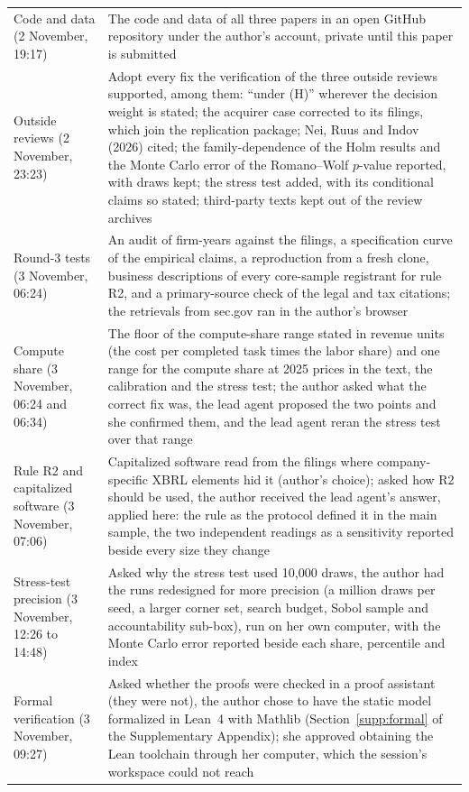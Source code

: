 {\begin{longtable}{@{}p{}p{}@{}}
Code and data (2 November, 19:17) & The code and data of all three papers in an open GitHub repository under the author's account, private until this paper is submitted\\
Outside reviews (2 November, 23:23) & Adopt every fix the verification of the three outside reviews supported, among them: ``under (H)'' wherever the decision weight is stated; the acquirer case corrected to its filings, which join the replication package; Nei, Ruus and Indov (2026) cited; the family-dependence of the Holm results and the Monte Carlo error of the Romano--Wolf $p$-value reported, with \BootB{} draws kept; the stress test added, with its conditional claims so stated; third-party texts kept out of the review archives\\
Round-3 tests (3 November, 06:24) & An audit of firm-years against the filings, a specification curve of the empirical claims, a reproduction from a fresh clone, business descriptions of every core-sample registrant for rule R2, and a primary-source check of the legal and tax citations; the retrievals from sec.gov ran in the author's browser\\
Compute share (3 November, 06:24 and 06:34) & The floor of the compute-share range stated in revenue units (the cost per completed task times the labor share) and one range for the compute share at 2025 prices in the text, the calibration and the stress test; the author asked what the correct fix was, the lead agent proposed the two points and she confirmed them, and the lead agent reran the stress test over that range\\
Rule R2 and capitalized software (3 November, 07:06) & Capitalized software read from the filings where company-specific XBRL elements hid it (author's choice); asked how R2 should be used, the author received the lead agent's answer, applied here: the rule as the protocol defined it in the main sample, the two independent readings as a sensitivity reported beside every size they change\\
Stress-test precision (3 November, 12:26 to 14:48) & Asked why the stress test used 10{,}000 draws, the author had the runs redesigned for more precision (a million draws per seed, a larger corner set, search budget, Sobol sample and accountability sub-box), run on her own computer, with the Monte Carlo error reported beside each share, percentile and index\\
Formal verification (3 November, 09:27) & Asked whether the proofs were checked in a proof assistant (they were not), the author chose to have the static model formalized in Lean~4 with Mathlib (Section~\ref{supp:formal} of the Supplementary Appendix); she approved obtaining the Lean toolchain through her computer, which the session's workspace could not reach\\

\end{longtable}}
